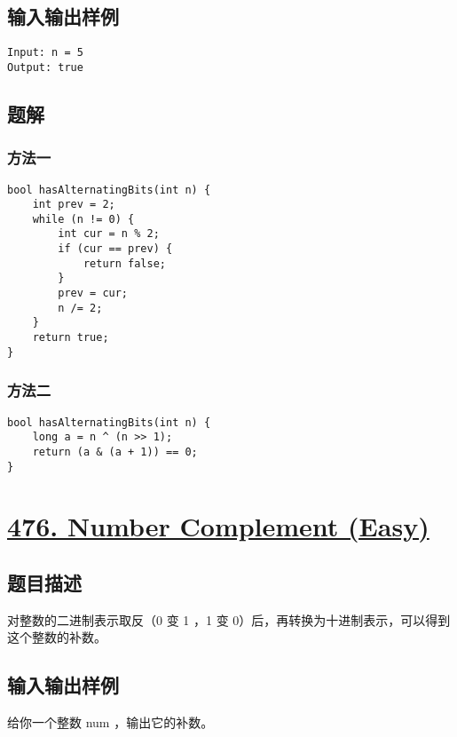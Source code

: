 \documentclass[lang=cn,10pt]{elegantbook}
\begin{document}
\subsection*{输入输出样例}

\begin{lstlisting}
Input: n = 5
Output: true
\end{lstlisting}

\subsection*{题解}

\subsubsection*{方法一}

\begin{lstlisting}
bool hasAlternatingBits(int n) {
	int prev = 2;
	while (n != 0) {
		int cur = n % 2;
		if (cur == prev) {
			return false;
		}
		prev = cur;
		n /= 2;
	}
	return true;
}
\end{lstlisting}

\subsubsection*{方法二}

\begin{lstlisting}
bool hasAlternatingBits(int n) {
	long a = n ^ (n >> 1);
	return (a & (a + 1)) == 0;
}
\end{lstlisting}

{\color{red}\section{\href{https://leetcode.cn/problems/number-complement/submissions/}{476. Number Complement (Easy)}}} \label{ch10.476}

\subsection*{题目描述}

对整数的二进制表示取反（0 变 1 ，1 变 0）后，再转换为十进制表示，可以得到这个整数的补数。

\subsection*{输入输出样例}

给你一个整数 num ，输出它的补数。
\end{document}
